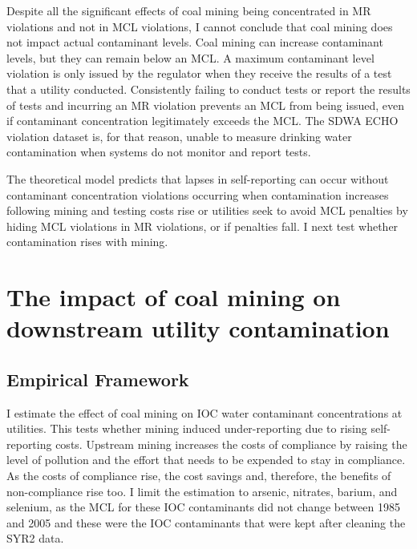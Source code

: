 \documentclass{article}
\begin{document}
Despite all the significant effects of coal mining being concentrated in MR violations and not in MCL violations, I cannot conclude that coal mining does not impact actual contaminant levels. Coal mining can increase contaminant levels, but they can remain below an MCL. A maximum contaminant level violation is only issued by the regulator when they receive the results of a test that a utility conducted. Consistently failing to conduct tests or report the results of tests and incurring an MR violation prevents an MCL from being issued, even if contaminant concentration legitimately exceeds the MCL. The SDWA ECHO violation dataset is, for that reason, unable to measure drinking water contamination when systems do not monitor and report tests. 

The theoretical model predicts that lapses in self-reporting can occur without contaminant concentration violations occurring when contamination increases following mining and testing costs rise or utilities seek to avoid MCL penalties by hiding MCL violations in MR violations, or if penalties fall. I next test whether contamination rises with mining.

\begin{landscape}

\end{landscape}





\section{The impact of coal mining on downstream utility contamination}

\subsection{Empirical Framework}

I estimate the effect of coal mining on IOC water contaminant concentrations at utilities. This tests whether mining induced under-reporting due to rising self-reporting costs. Upstream mining increases the costs of compliance by raising the level of pollution and the effort that needs to be expended to stay in compliance. As the costs of compliance rise, the cost savings and, therefore, the benefits of non-compliance rise too. I limit the estimation to arsenic, nitrates, barium, and selenium, as the MCL for these IOC contaminants did not change between 1985 and 2005 and these were the IOC contaminants that were kept after cleaning the SYR2 data.
\end{document}
